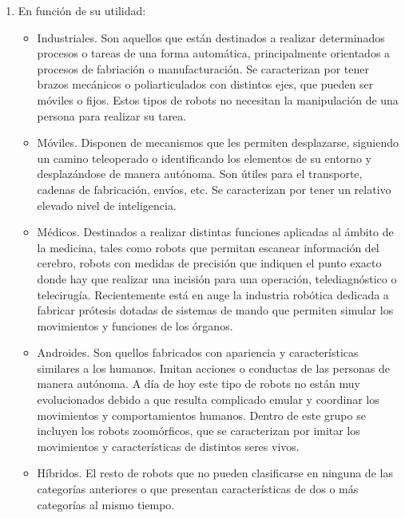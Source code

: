 \documentclass{report}
\begin{document}
\begin{enumerate}
	\item En función de su utilidad:
	\begin{itemize}
		\item Industriales. Son aquellos que están destinados a realizar determinados procesos o tareas de una forma automática, principalmente orientados a procesos de fabriación o manufacturación. Se caracterizan por tener brazos mecánicos o poliarticulados con distintos ejes, que pueden ser móviles o fijos. Estos tipos de robots no necesitan la manipulación de una persona para realizar su tarea.
		
		\item Móviles. Disponen de mecanismos que les permiten desplazarse, siguiendo un camino teleoperado o identificando los elementos de su entorno y desplazándose de manera autónoma. Son útiles para el transporte, cadenas de fabricación, envíos, etc. Se caracterizan por tener un relativo elevado nivel de inteligencia.
		
		\item Médicos. Destinados a realizar distintas funciones aplicadas al ámbito de la medicina, tales como robots que permitan escanear información del cerebro, robots con medidas de precisión que indiquen el punto exacto donde hay que realizar una incisión para una operación, telediagnóstico o telecirugía. Recientemente está en auge la industria robótica dedicada a fabricar prótesis dotadas de sistemas de mando que permiten simular los movimientos y funciones de los órganos.
		
		\item Androides. Son quellos fabricados con apariencia y características similares a los humanos. Imitan acciones o conductas de las personas de manera autónoma. A día de hoy este tipo de robots no están muy evolucionados debido a que resulta complicado emular y coordinar los movimientos y comportamientos humanos. Dentro de este grupo se incluyen los robots zoomórficos, que se caracterizan por imitar los movimientos y características de distintos seres vivos.
		 
		\item Híbridos. El resto de robots que no pueden clasificarse en ninguna de las categorías anteriores o que presentan características de dos o más categorías al mismo tiempo.
		

\end{itemize}
\end{enumerate}
\end{document}
